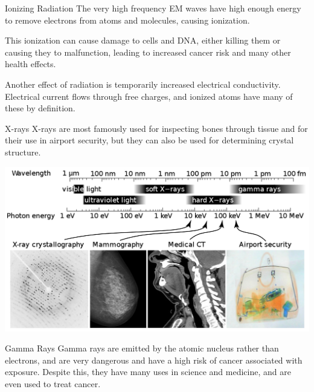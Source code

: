 \documentclass{beamer}
\begin{document}
\begin{frame}{Ionizing Radiation}
    The very high frequency EM waves have high enough energy to remove electrons from atoms and molecules, causing ionization. \newline
    
    This ionization can cause damage to cells and DNA, either killing them or causing they to malfunction, leading to increased cancer risk and many other health effects. \newline
    
    Another effect of radiation is temporarily increased electrical conductivity. Electrical current flows through free charges, and ionized atoms have many of these by definition.
\end{frame}

\begin{frame}{X-rays}
X-rays are most famously used for inspecting bones through tissue and for their use in airport security, but they can also be used for determining crystal structure. 

\includegraphics[scale=.25]{xrayuses.png}
\end{frame}

\begin{frame}{Gamma Rays}
    Gamma rays are emitted by the atomic nucleus rather than electrons, and are very dangerous and have a high risk of cancer associated with exposure. Despite this, they have many uses in science and medicine, and are even used to treat cancer.
\end{frame}
\end{document}
